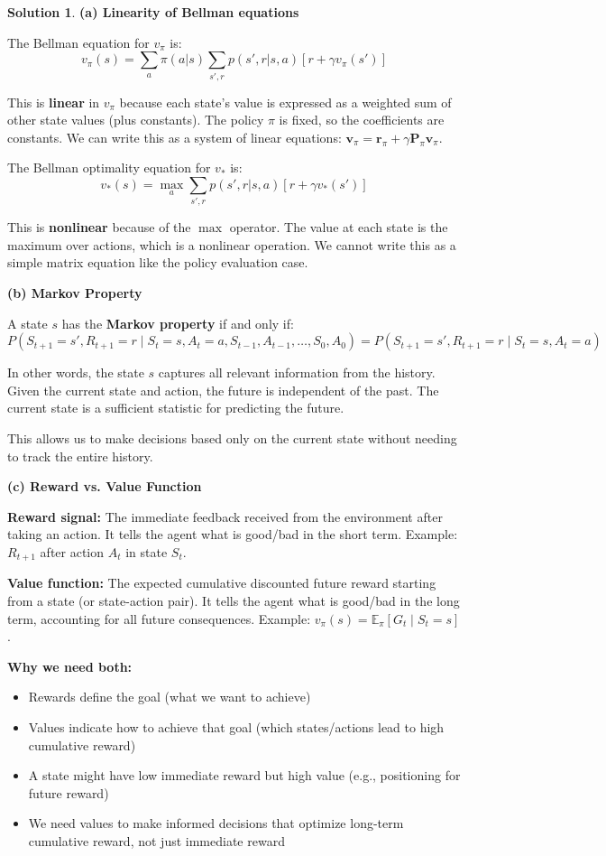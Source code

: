 \documentclass[11pt]{article}
\theoremstyle{definition}
\newtheorem*{solution}{Solution}
\begin{document}
\begin{solution}
\textbf{(a) Linearity of Bellman equations}

The Bellman equation for $v_\pi$ is:
\[
v_\pi(s) = \sum_a \pi(a|s) \sum_{s',r} p(s',r|s,a)[r + \gamma v_\pi(s')]
\]

This is \textbf{linear} in $v_\pi$ because each state's value is expressed as a weighted sum of other state values (plus constants). The policy $\pi$ is fixed, so the coefficients are constants. We can write this as a system of linear equations: $\mathbf{v}_\pi = \mathbf{r}_\pi + \gamma \mathbf{P}_\pi \mathbf{v}_\pi$.

The Bellman optimality equation for $v_*$ is:
\[
v_*(s) = \max_a \sum_{s',r} p(s',r|s,a)[r + \gamma v_*(s')]
\]

This is \textbf{nonlinear} because of the $\max$ operator. The value at each state is the maximum over actions, which is a nonlinear operation. We cannot write this as a simple matrix equation like the policy evaluation case.

\textbf{(b) Markov Property}

A state $s$ has the \textbf{Markov property} if and only if:
\[
P(S_{t+1} = s', R_{t+1} = r \mid S_t = s, A_t = a, S_{t-1}, A_{t-1}, \ldots, S_0, A_0) = P(S_{t+1} = s', R_{t+1} = r \mid S_t = s, A_t = a)
\]

In other words, the state $s$ captures all relevant information from the history. Given the current state and action, the future is independent of the past. The current state is a sufficient statistic for predicting the future.

This allows us to make decisions based only on the current state without needing to track the entire history.

\textbf{(c) Reward vs. Value Function}

\textbf{Reward signal:} The immediate feedback received from the environment after taking an action. It tells the agent what is good/bad in the short term. Example: $R_{t+1}$ after action $A_t$ in state $S_t$.

\textbf{Value function:} The expected cumulative discounted future reward starting from a state (or state-action pair). It tells the agent what is good/bad in the long term, accounting for all future consequences. Example: $v_\pi(s) = \mathbb{E}_\pi[G_t \mid S_t = s]$.

\textbf{Why we need both:}
\begin{itemize}
    \item Rewards define the goal (what we want to achieve)
    \item Values indicate how to achieve that goal (which states/actions lead to high cumulative reward)
    \item A state might have low immediate reward but high value (e.g., positioning for future reward)
    \item We need values to make informed decisions that optimize long-term cumulative reward, not just immediate reward
\end{itemize}


\end{solution}
\end{document}
